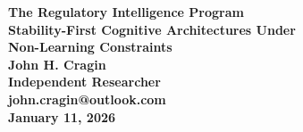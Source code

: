 \documentclass[12pt,a4paper]{report}
\begin{document}
\begin{titlepage}
  \vspace*{\fill} %
  \begin{center}
    \Huge\bfseries The Regulatory Intelligence Program \\[0.5em]
    \Large Stability-First Cognitive Architectures Under \\[0.2em]
    \Large Non-Learning Constraints \\[2em] %
    
    \large John H. Cragin \\[0.5em]
    \normalsize Independent Researcher \\[0.2em]
    \normalsize john.cragin@outlook.com \\[2em]
    
    \normalsize January 11, 2026
  \end{center}
  \vspace*{\fill} %
\end{titlepage}

\onehalfspacing

	\tableofcontents
\newpage
\end{document}
